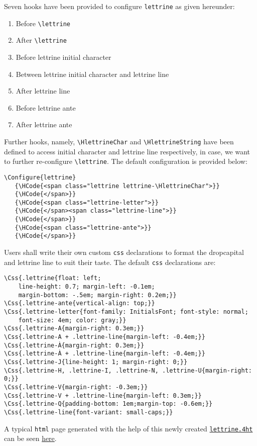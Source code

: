 \documentclass[a4paper]{article}
\let\hlink\href
\begin{document}
Seven \texht hooks have been provided to configure \Verb=lettrine= as
given hereunder:
\begin{enumerate}
\item Before \Verb=\lettrine=
\item After  \Verb=\lettrine=
\item Before lettrine initial character
\item Between lettrine initial character and lettrine line
\item After lettrine line
\item Before lettrine ante
\item After lettrine ante
\end{enumerate}
Further hooks, namely, \Verb=\HlettrineChar= and
\Verb=\HlettrineString= have been defined to access initial character
and lettrine line respectively, in case, we want to further
re-configure \Verb=\lettrine=.  The default configuration is provided
below:
\begin{verbatim}
\Configure{lettrine}
   {\HCode{<span class="lettrine lettrine-\HlettrineChar">}}
   {\HCode{</span>}}
   {\HCode{<span class="lettrine-letter">}}
   {\HCode{</span><span class="lettrine-line">}}
   {\HCode{</span>}}
   {\HCode{<span class="lettrine-ante">}}
   {\HCode{</span>}}
\end{verbatim}
Users shall write their own custom \Verb=css= declarations to format the
dropcapital and lettrine line to suit their taste. The default
\Verb=css= declarations are:
\begin{verbatim}
\Css{.lettrine{float: left;
    line-height: 0.7; margin-left: -0.1em;
    margin-bottom: -.5em; margin-right: 0.2em;}}
\Css{.lettrine-ante{vertical-align: top;}}
\Css{.lettrine-letter{font-family: InitialsFont; font-style: normal;
    font-size: 4em; color: gray;}}
\Css{.lettrine-A{margin-right: 0.3em;}}
\Css{.lettrine-A + .lettrine-line{margin-left: -0.4em;}}
\Css{.lettrine-À{margin-right: 0.3em;}}
\Css{.lettrine-À + .lettrine-line{margin-left: -0.4em;}}
\Css{.lettrine-J{line-height: 1; margin-right: 0;}}
\Css{.lettrine-H, .lettrine-I, .lettrine-N, .lettrine-U{margin-right: 0;}}
\Css{.lettrine-V{margin-right: -0.3em;}}
\Css{.lettrine-V + .lettrine-line{margin-left: 0.3em;}}
\Css{.lettrine-Q{padding-bottom: 1em;margin-top: -0.6em;}}
\Css{.lettrine-line{font-variant: small-caps;}}
\end{verbatim}

A typical \Verb=html= page generated with the help of this newly
created
\hlink{http://download.river-valley.com/tex4ht/lettrine/lettrine.4ht}
{\Verb=lettrine.4ht=} can be seen
\hlink{http://download.river-valley.com/tex4ht/lettrine/ltrn-test.html}{here}.

\ifx{} 
\end{document}
